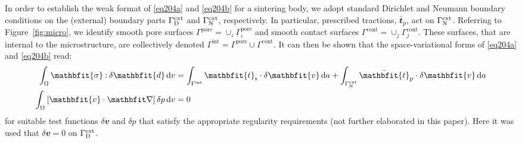 \documentclass[10pt,a4paper]{article}
\renewcommand{\ta}[1]{\mathbfit{#1}}
\renewcommand{\ts}[1]{\mathbfit{#1}}
\renewcommand{\Box}{\mdlgwhtsquare}
\newcommand{\figref}[1]{Figure~\ref{#1}}
\newcommand{\pore}{\mathrm{pore}}
\newcommand{\prescribed}{\mathrm{p}}
\newcommand{\contact}{\mathrm{cont}}
\newcommand{\external}{\mathrm{ext}}
\newcommand{\internal}{\mathrm{int}}
\newcommand{\surf}{\mathrm{s}}
\begin{document}
In order to establish the weak format of \eqref{eq204a} and \eqref{eq204b} for a sintering body, we adopt standard Dirichlet and Neumann boundary conditions on the (external) boundary parts $\Gamma^\external_\Dirichlet$ and $\Gamma^\external_\Neumann$, respectively. In particular, prescribed tractions, $\bar{\ta t}_\prescribed$, act on $\Gamma^\external_\Neumann$. Referring to \figref{fig:micro}, we identify smooth pore surfaces $\Gamma^\pore=\cup_i\Gamma^\pore_i$ and smooth contact surfaces $\Gamma^\contact=\cup_j\Gamma^\contact_j$. These surfaces, that are internal to the microstructure, are collectively denoted $\Gamma^\internal=\Gamma^\pore\cup\Gamma^\contact$. It can then be shown that the space-variational forms of \eqref{eq204a} and \eqref{eq204b} read:
\begin{align}
    \int_{\Omega} \ts{\sigma}\dprod\delta \ts{d} \dif v
    & =
    \int_{\Gamma^\internal} \ta{t}_\surf \cdot \delta\ta{v} \dif a
    + \int_{\Gamma^\external_\Neumann} \bar{\ta t}_\prescribed\cdot\delta \ta{v} \dif a
\label{eq205a} \\
    \int_{\Omega} \left[\ta{v}\cdot\diff\right] \delta p \dif v
    & =  0
\label{eq205b}
\end{align}
for suitable test functions $\delta\ta{v}$ and $\delta p$ that satisfy the appropriate regularity requirements (not further elaborated in this paper). Here it was used that $\delta\ta{v}=\ta{0}$ on $\Gamma^\external_\Dirichlet$.
\end{document}

